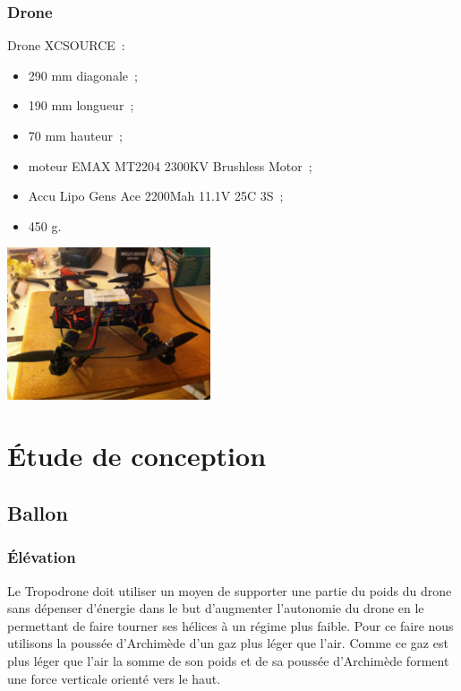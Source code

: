 \documentclass[a4paper,11pt]{article}
\begin{document}
\subsubsection{Drone}
\begin{multicols}{2}
	Drone XCSOURCE~: \\
	\begin{itemize}
		\item 290 mm diagonale~;
		\item 190 mm longueur~;
		\item 70 mm hauteur~;
		\item moteur EMAX MT2204 2300KV Brushless Motor~;
		\item Accu Lipo Gens Ace 2200Mah 11.1V 25C 3S~;
		\item 450 g.
	\end{itemize}
	\begin{center}
		\includegraphics[width=6cm]{../Images/drone.JPG}
	\end{center}
\end{multicols}

\newpage

\section{Étude de conception}

\subsection{Ballon}

\subsubsection{Élévation}

Le Tropodrone doit utiliser un moyen de supporter une partie du poids du drone sans dépenser d'énergie dans le but d'augmenter l'autonomie du drone en le permettant de faire tourner ses hélices à un régime plus faible. Pour ce faire nous utilisons la poussée d'Archimède d'un gaz plus léger que l'air. Comme ce gaz est plus léger que l'air la somme de son poids et de sa poussée d'Archimède forment une force verticale orienté vers le haut.
\end{document}
